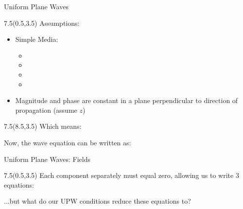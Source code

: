 \begin{lesson35}
%
\begin{frame}{Uniform Plane Waves}
	\begin{textblock}{7.5}(0.5,3.5) 
	Assumptions:
	\begin{itemize}
		\item Simple Media:
		\begin{itemize}
			\setlength\itemsep{8pt}
			\item {}
			\item {}
			\item {}
			\item {}
		\end{itemize}
		\item Magnitude and phase are constant in a plane perpendicular to direction of propagation (assume $z$)
	\end{itemize}
	\end{textblock}

\begin{textblock}{7.5}(8.5,3.5)
Which means:
\vspace{-8pt}

Now, the wave equation can be written as: 
\begin{small}
\end{small}
\end{textblock}
\end{frame}

\begin{frame}{Uniform Plane Waves: Fields}
\begin{textblock}{7.5}(0.5,3.5) 
Each component separately must equal zero, allowing us to write 3 equations:
\begin{small}
\end{small}
...but what do our UPW conditions reduce these equations to? 


\end{textblock}
\end{frame}
\end{lesson35}
